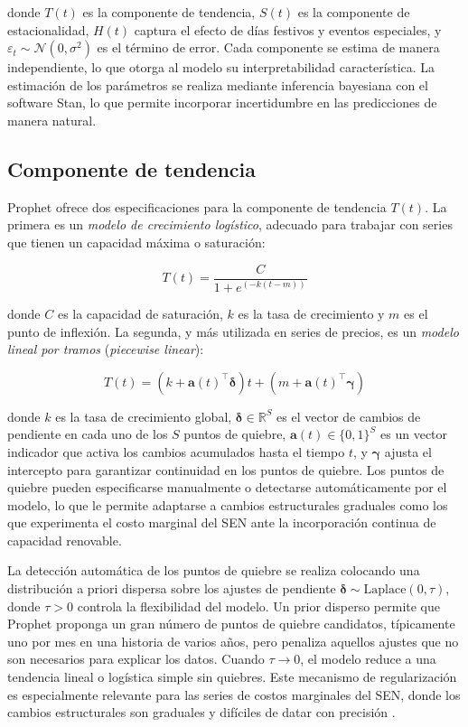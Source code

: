 donde $T(t)$ es la componente de tendencia, $S(t)$ es la componente de estacionalidad, $H(t)$ captura el efecto de días festivos y eventos especiales, y $\varepsilon_t \sim \mathcal{N}(0, \sigma^2)$ es el término de error. Cada componente se estima de manera independiente, lo que otorga al modelo su interpretabilidad característica. La estimación de los parámetros se realiza mediante inferencia bayesiana con el software Stan, lo que permite incorporar incertidumbre en las predicciones de manera natural.

\subsection{Componente de tendencia}

Prophet ofrece dos especificaciones para la componente de tendencia $T(t)$. La primera es un \textit{modelo de crecimiento logístico}, adecuado para trabajar con series que tienen un capacidad máxima o saturación:

\begin{equation}
T(t) = \frac{C}{1 + e^{(-k(t - m))}}
\end{equation}

donde $C$ es la capacidad de saturación, $k$ es la tasa de crecimiento y $m$ es el punto de inflexión. La segunda, y más utilizada en series de precios, es un \textit{modelo lineal por tramos} (\textit{piecewise linear}):

\begin{equation}
T(t) = (k + \mathbf{a}(t)^\top \boldsymbol{\delta})t + (m + \mathbf{a}(t)^\top \boldsymbol{\gamma})
\end{equation}

donde $k$ es la tasa de crecimiento global, $\boldsymbol{\delta} \in \mathbb{R}^S$ es el vector de cambios de pendiente en cada uno de los $S$ puntos de quiebre, $\mathbf{a}(t) \in \{0,1\}^S$ es un vector indicador que activa los cambios acumulados hasta el tiempo $t$, y $\boldsymbol{\gamma}$ ajusta el intercepto para garantizar continuidad en los puntos de quiebre. Los puntos de quiebre pueden especificarse manualmente o detectarse automáticamente por el modelo, lo que le permite adaptarse a cambios estructurales graduales como los que experimenta el costo marginal del SEN ante la incorporación continua de capacidad renovable.

La detección automática de los puntos de quiebre se realiza colocando una distribución a priori dispersa sobre los ajustes de pendiente $\boldsymbol{\delta} \sim \text{Laplace}(0, \tau)$, donde $\tau > 0$ controla la flexibilidad del modelo. Un prior disperso permite que Prophet proponga un gran número de puntos de quiebre candidatos, típicamente uno por mes en una historia de varios años, pero penaliza aquellos ajustes que no son necesarios para explicar los datos. Cuando $\tau \to 0$, el modelo reduce a una tendencia lineal o logística simple sin quiebres. Este mecanismo de regularización es especialmente relevante para las series de costos marginales del SEN, donde los cambios estructurales son graduales y difíciles de datar con precisión \cite{Prophet}.

